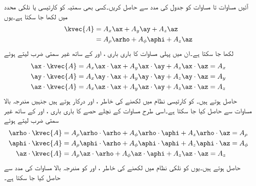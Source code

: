 آئیں مساوات  تا مساوات  کو جدول  کی مدد سے حاصل کریں۔کسی بھی سمتیہ  کو کارتیسی یا نلکی محدد میں لکھا جا سکتا ہے۔یوں
\begin{gather}
\begin{aligned}\label{مساوات_سمتیہ_سمتیہ_نلکی_کارتیسی_اشکال}
\kvec{A}&=A_x \ax+A_y \ay+A_z\az\\
&=A_\rho \arho+A_\phi \aphi+A_z \az
\end{aligned}
\end{gather}
لکھا جا سکتا ہے۔ان میں پہلی مساوات کا باری باری ،  اور  کے ساتھ غیر سمتی ضرب لیتے ہوئے 
\begin{gather}
\begin{aligned}\label{مساوات_سمتیہ_کارتیسی_اجزاء}
\ax \cdot \kvec{A}&=A_x \ax \cdot \ax+A_y \ax \cdot \ay+A_z \ax \cdot \az=A_x\\
\ay \cdot \kvec{A}&=A_x \ay \cdot \ax+A_y \ay \cdot \ay+A_z \ay \cdot \az=A_y\\
\az \cdot \kvec{A}&=A_x \az \cdot \ax+A_y \az \cdot \ay+A_z \az \cdot \az=A_z
\end{aligned}
\end{gather}
حاصل ہوتے ہیں۔ کو کارتیسی نظام میں لکھنے کی خاطر ،  اور  درکار ہوتے ہیں جنہیں مندرجہ بالا مساوات سے حاصل کیا جا سکتا ہے۔اسی طرح مساوات  کے نچلے حصے کا باری باری ،  اور  کے ساتھ غیر سمتی ضرب لیتے ہوئے
\begin{gather}
\begin{aligned}\label{مساوات_سمتیہ_نلکی_اجزاء}
\arho \cdot \kvec{A}&=A_\rho \arho \cdot \arho +A_\phi \arho \cdot \aphi +A_z \arho \cdot \az=A_\rho\\
\aphi \cdot \kvec{A}&=A_\rho \aphi \cdot \arho +A_\phi \aphi \cdot \aphi +A_z \aphi \cdot \az=A_\phi \\
\az \cdot \kvec{A}&=A_\rho \az \cdot \arho +A_\phi \az \cdot \aphi +A_z \az \cdot \az=A_z
\end{aligned}
\end{gather}
حاصل ہوتے ہیں۔یوں  کو نلکی نظام میں لکھنے کی خاطر ،  اور  کو مندرجہ بالا مساوات کی مدد سے حاصل کیا جا سکتا ہے۔

